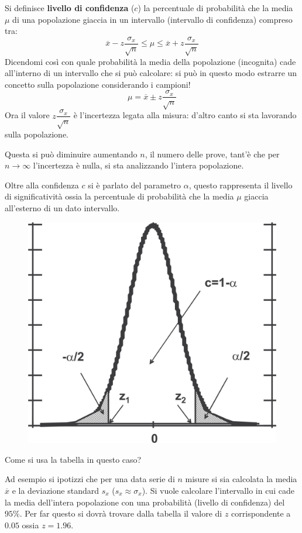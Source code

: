 \documentclass[a4paper, 15pt]{article}
\begin{document}
\begin{adjustwidth}{2in}{}
	Si definisce \textbf{livello di confidenza} ($ c $) la percentuale di probabilità che la media $\mu$ di una popolazione giaccia in un intervallo (intervallo di confidenza) compreso tra:
	\[\overline{x} - z\dfrac{\sigma_x}{\sqrt{n}} \leq \mu \leq \overline{x} + z\dfrac{\sigma_x}{\sqrt{n}} \]
	Dicendomi così con quale probabilità la media della popolazione (incognita) cade all'interno di un intervallo che si può calcolare: si può in questo modo estrarre un concetto sulla popolazione considerando i campioni! 	
	\[\mu = \overline{x} \pm z\dfrac{\sigma_x}{\sqrt{n}}\]		
	Ora il valore $z\dfrac{\sigma_x}{\sqrt{n}}$ è l'incertezza legata alla misura: d'altro canto si sta lavorando sulla popolazione. 
		
	Questa si può diminuire aumentando $n$, il numero delle prove, tant'è che per $n\rightarrow\infty$ l'incertezza è nulla, si sta analizzando l'intera popolazione. \newline 
	
	Oltre alla confidenza $c$ si è parlato del parametro $\alpha$, questo rappresenta il livello di significatività ossia la percentuale di probabilità che la media $\mu$ giaccia all’esterno di un dato intervallo. 	
	\begin{figure}[H]
		\centering
		\includegraphics[width=0.5\linewidth]{fig/screenshot008}
		\label{fig:screenshot008}
	\end{figure}	
	Come si usa la tabella in questo caso? 
	
	Ad esempio si ipotizzi che per una data serie di $ n $ misure si sia calcolata la media $\overline{x}$ e la deviazione standard $ s_x $ ($s_x\approx\sigma_x$). Si vuole calcolare l’intervallo in cui cade la media dell’intera popolazione con una probabilità (livello di confidenza) del $ 95\% $. Per far questo si dovrà trovare dalla tabella il valore di $ z $ corrispondente a $ 0.05 $ ossia $ z=1.96 $. \newline 
\end{adjustwidth}
\newpage
\end{document}
